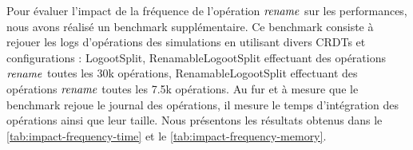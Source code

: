 Pour évaluer l'impact de la fréquence de l'opération $\trm{rename}$ sur les performances, nous avons réalisé un benchmark supplémentaire.
Ce benchmark consiste à rejouer les logs d'opérations des simulations en utilisant divers \acp{CRDT} et configurations : LogootSplit, RenamableLogootSplit effectuant des opérations $\trm{rename}$ toutes les 30k opérations, RenamableLogootSplit effectuant des opérations $\trm{rename}$ toutes les 7.5k opérations.
Au fur et à mesure que le benchmark rejoue le journal des opérations, il mesure le temps d'intégration des opérations ainsi que leur taille.
Nous présentons les résultats obtenus dans le \autoref{tab:impact-frequency-time} et le \autoref{tab:impact-frequency-memory}.

\begin{table}[!ht]
  \centering
  \caption{Temps d'intégration par type et par fréquence d'opérations $\trm{rename}$}
  \label{tab:impact-frequency-time}
\end{table}

